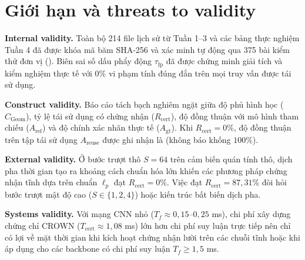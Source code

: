 \documentclass[11pt,a4paper]{article}
\newcommand{\code}[1]{\texttt{\detokenize{#1}}}
\begin{document}
\section{Giới hạn và threats to validity}
\textbf{Internal validity.} Toàn bộ 214 file lịch sử từ Tuần 1--3 và các bảng thực nghiệm Tuần 4 đã được khóa mã băm SHA-256 và xác minh tự động qua 375 bài kiểm thử đơn vị (\code{tests/run_all_tests.py}). Biên sai số dấu phẩy động $\tau_{\text{fp}}$ đã được chứng minh giải tích và kiểm nghiệm thực tế với $0\%$ vi phạm tính đúng đắn trên mọi truy vấn được tái sử dụng.

\textbf{Construct validity.} Báo cáo tách bạch nghiêm ngặt giữa độ phủ hình học ($C_{\text{Geom}}$), tỷ lệ tái sử dụng có chứng nhận ($R_{\text{cert}}$), độ đồng thuận với mô hình tham chiếu ($A_{\text{ref}}$) và độ chính xác nhãn thực tế ($A_{\text{gt}}$). Khi $R_{\text{cert}} = 0\%$, độ đồng thuận trên tập tái sử dụng $A_{\text{reuse}}$ được ghi nhận là \code{null} (không báo khống $100\%$).

\textbf{External validity.} Ở bước trượt thô $S=64$ trên cảm biến quán tính thô, dịch pha thời gian tạo ra khoảng cách chuẩn hóa lớn khiến các phương pháp chứng nhận tĩnh dựa trên chuẩn $\ell_p$ đạt $R_{\text{cert}} = 0\%$. Việc đạt $R_{\text{cert}} = 87{,}31\%$ đòi hỏi bước trượt mật độ cao ($S \in \{1, 2, 4\}$) hoặc kiến trúc bất biến dịch pha.

\textbf{Systems validity.} Với mạng CNN nhỏ ($T_f \approx 0{,}15\text{--}0{,}25$ ms), chi phí xây dựng chứng chỉ CROWN ($T_{\text{cert}} \approx 1{,}08$ ms) lớn hơn chi phí suy luận trực tiếp nên chỉ có lợi về mặt thời gian khi kích hoạt chứng nhận lười trên các chuỗi tĩnh hoặc khi áp dụng cho các backbone có chi phí suy luận $T_f \ge 1{,}5$ ms.
\end{document}
